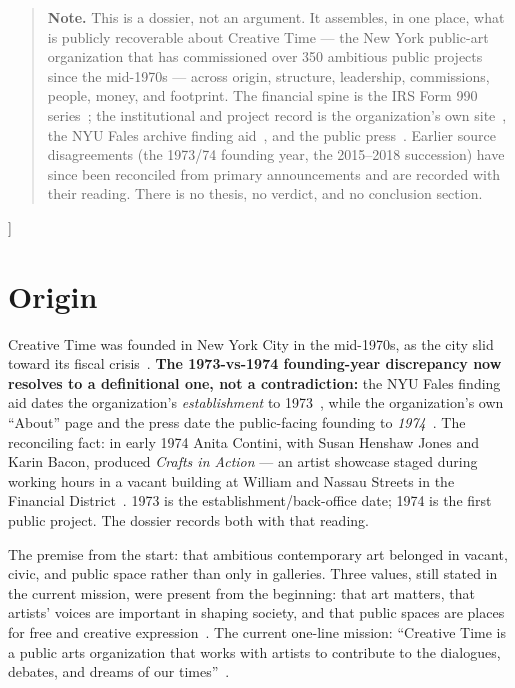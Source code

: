 \documentclass[10pt,letterpaper,twocolumn]{article}
\begin{document}
{\begin{quote}
\small\noindent\textbf{Note.} This is a dossier, not an argument. It assembles, in one place, what is publicly recoverable about Creative Time --- the New York public-art organization that has commissioned over 350 ambitious public projects since the mid-1970s --- across origin, structure, leadership, commissions, people, money, and footprint. The financial spine is the IRS Form 990 series~\citep{ctpropublica}; the institutional and project record is the organization's own site~\citep{ctabout}, the NYU Fales archive finding aid~\citep{ctfales}, and the public press~\citep{ctwiki,ct50avenue}. Earlier source disagreements (the 1973/74 founding year, the 2015--2018 succession) have since been reconciled from primary announcements and are recorded with their reading. There is no thesis, no verdict, and no conclusion section.
\end{quote}
\vspace{0.5em}
}]

\section{Origin}

Creative Time was founded in New York City in the mid-1970s, as the city slid toward its fiscal crisis~\citep{ctwiki,ct50avenue}. \textbf{The 1973-vs-1974 founding-year discrepancy now resolves to a definitional one, not a contradiction:} the NYU Fales finding aid dates the organization's \emph{establishment} to 1973~\citep{ctfales}, while the organization's own ``About'' page and the press date the public-facing founding to \emph{1974}~\citep{ctabout,ctwiki}. The reconciling fact: in early 1974 Anita Contini, with Susan Henshaw Jones and Karin Bacon, produced \emph{Crafts in Action} --- an artist showcase staged during working hours in a vacant building at William and Nassau Streets in the Financial District~\citep{ctfamilystyle}. 1973 is the establishment/back-office date; 1974 is the first public project. The dossier records both with that reading.

The premise from the start: that ambitious contemporary art belonged in vacant, civic, and public space rather than only in galleries. Three values, still stated in the current mission, were present from the beginning: that art matters, that artists' voices are important in shaping society, and that public spaces are places for free and creative expression~\citep{ctfales,ctabout}. The current one-line mission: ``Creative Time is a public arts organization that works with artists to contribute to the dialogues, debates, and dreams of our times''~\citep{ctabout}.
\end{document}
